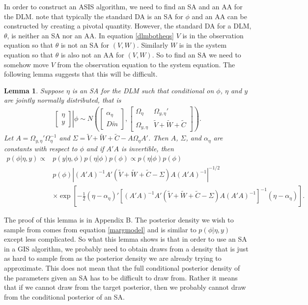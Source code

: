 \documentclass[12pt]{article}
\newtheorem{lem}{Lemma}
\begin{document}
In order to construct an ASIS algorithm, we need to find an SA and an AA for the DLM. \citet{papaspiliopoulos2007general} note that typically the standard DA is an SA for $\phi$ and an AA can be constructed by creating a pivotal quantity. However, the standard DA for a DLM, $\theta$, is neither an SA nor an AA. In equation \eqref{dlmbotheqs} $V$ is in the observation equation so that $\theta$ is not an SA for $(V,W)$. Similarly $W$ is in the system equation so that $\theta$ is also not an AA for $(V,W)$. So to find an SA we need to somehow move $V$ from the observation equation to the system equation. The following lemma suggests that this will be difficult.

\begin{lem}\label{noSA}
Suppose $\eta$ is an SA for the DLM such that conditional on $\phi$, $\eta$ and $y$ are jointly normally distributed, that is
\begin{align*}
 \left. \begin{bmatrix}\eta \\ y \end{bmatrix}\right|\phi \sim N\left(\begin{bmatrix} \alpha_\eta \\ D\tilde{m} \end{bmatrix}, \begin{bmatrix}
   \Omega_\eta & \Omega_{y,\eta}' \\
   \Omega_{y,\eta} & \tilde{V} + \tilde{W} + \tilde{C} \end{bmatrix}\right).
\end{align*}
Let $A=\Omega_{y,\eta}'\Omega_{\eta}^{-1}$ and $\Sigma = \tilde{V} + \tilde{W} + \tilde{C} - A\Omega_{\eta}A'$. Then $A$, $\Sigma$, and $\alpha_{\eta}$ are constants with respect to $\phi$ and if $A'A$ is invertible, then \vspace{-.3cm}
\begin{align*}
p(\phi|\eta,y) \propto & p(y|\eta,\phi)p(\eta|\phi)p(\phi) \propto p(\eta|\phi)p(\phi) \\
 & p(\phi)|(A'A)^{-1}A'(\tilde{V} + \tilde{W} + \tilde{C} - \Sigma)A(A'A)^{-1}|^{-1/2}\\
&\times \exp\left[-\frac{1}{2}(\eta - \alpha_{\eta})'[(A'A)^{-1}A'(\tilde{V} + \tilde{W} + \tilde{C} - \Sigma)A(A'A)^{-1}]^{-1}(\eta - \alpha_{\eta})\right].
\end{align*}
\end{lem}
\noindent The proof of this lemma is in Appendix B. The posterior density we wish to sample from comes from equation \eqref{margmodel} and is similar to $p(\phi|\eta,y)$ except less complicated. So what this lemma shows is that in order to use an SA in a GIS algorithm, we probably need to obtain draws from a density that is just as hard to sample from as the posterior density we are already trying to approximate. This does not mean that the full conditional posterior density of the parameters given an SA has to be difficult to draw from. Rather it means that if we cannot draw from the target posterior, then we probably cannot draw from the conditional posterior of an SA.
\end{document}
